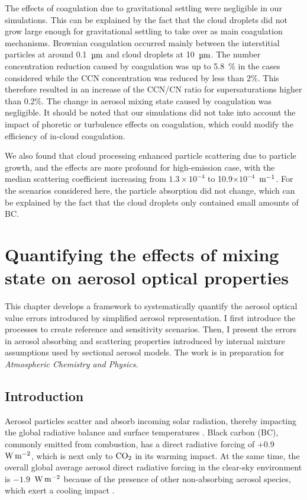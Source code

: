\documentclass[edeposit,fullpage]{uiucthesis2009}
\makeatletter
\DeclareRobustCommand*\unit[1]
 {\ensuremath{%
   {\thinmuskip3mu\relax
    \def\mu{\text{\textmu}}\def~{\,}%
    \ifx\f@series\testbx\mathbf{#1}\else\mathrm{#1}\fi}}}
\makeatother
\begin{document}
The effects of coagulation due to gravitational settling were
negligible in our simulations. This can be explained by the fact that
the cloud droplets did not grow large enough for gravitational
settling to take over as main coagulation mechanisms. Brownian
coagulation occurred mainly between the interstitial particles at
around 0.1~$\rm \mu m$ and cloud droplets at 10~$\rm \mu m$. The
number concentration reduction caused by coagulation was up to
5.8~$\%$ in the cases considered while the CCN concentration was
reduced by less than 2\%. This therefore resulted in an increase of
the CCN/CN ratio for supersaturations higher than 0.2\%. The change in
aerosol mixing state caused by coagulation was negligible. It should
be noted that our simulations did not take into account the impact of
phoretic or turbulence effects on coagulation, which could modify the
efficiency of in-cloud coagulation.

We also found that cloud processing enhanced particle
  scattering due to particle growth, and the effects are more profound
  for high-emission case, with the median scattering coefficient
  increasing from $1.3\times10^{-4}$ to 10.9$\times
  10^{-4}$~\unit{m^{-1}}. For the scenarios considered here, the
  particle absorption did not change, which can be explained by the
  fact that the cloud droplets only contained small amounts of BC.

\chapter{Quantifying the effects of mixing state on aerosol optical properties}
This chapter develops a framework to systematically quantify the
aerosol optical value errors introduced by simplified aerosol representation.  I first
introduce the processes to create reference and sensitivity
scenarios. Then, I present the errors in aerosol absorbing and
scattering properties introduced by internal mixture assumptions used
by sectional aerosol models. The work is in preparation for
\textit{Atmospheric Chemistry and Physics}.

\label{chap4}
\section{Introduction}  %
Aerosol particles scatter and absorb incoming solar radiation, thereby
impacting the global radiative balance and surface temperatures
\citep{mitchell1971effect, charlson1992climate, yu2006review,
  winker2010calipso, oikawa2013study, subba2020recent}. Black carbon
(BC), commonly emitted from combustion, has a direct radiative forcing
of $+0.9$~\unit{W\,m^{-2}}, which is next only to $\rm CO_2$
\citep{bond2013bounding, gustafsson2016convergence} in its warming
impact. At the same time, the overall global average aerosol direct
radiative forcing in the clear-sky environment is
$-1.9$~\unit{W\,m^{-2}} because of the presence of other
non-absorbing aerosol species, which exert a cooling impact
\citep{bellouin2005global}.
\end{document}
